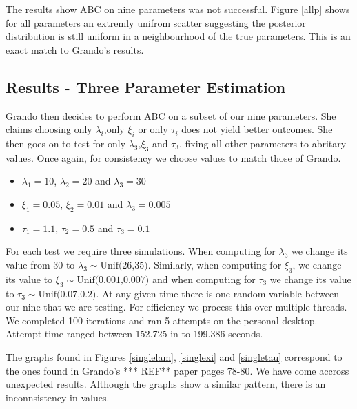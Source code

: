The results show ABC on nine parameters was not successful. Figure \ref{allp} shows for all parameters an extremly unifrom scatter suggesting the posterior distribution is still uniform in a neighbourhood of the true parameters. This is an exact match to Grando's results. 

\subsection{Results - Three Parameter Estimation}
\label{subsec3param}

Grando then decides to perform ABC on a subset of our nine parameters. She claims choosing only  $\lambda_i$,only $\xi_i$ or only $\tau_i$ does not yield better outcomes. She then goes on to test for only $\lambda_3$,$\xi_3$ and $\tau_3$, fixing all other parameters to abritary values. Once again, for consistency we choose values to match those of Grando.

\begin{itemize}
    \item $\lambda_1 = 10$, $\lambda_2 = 20$ and $\lambda_3 =30$
    \item $\xi_1 = 0.05$, $\xi_2 = 0.01 $ and $\lambda_3 =0.005$
    \item $\tau_1 =1.1$, $\tau_2 = 0.5$ and $\tau_3 =0.1$
\end{itemize}

For each test we require three simulations. When computing for $\lambda_3$ we change its value from 30 to $\lambda_3 \sim \text{Unif(26,35)}$. Similarly, when computing for $\xi_3$, we change its value to $\xi_3 \sim \text{Unif(0.001,0.007)}$ and when computing for $\tau_3$ we change its value to $\tau_3 \sim \text{Unif(0.07,0.2)}$. At any given time there is one random variable between our nine that we are testing. For efficiency we process this over multiple threads. We completed 100 iterations and ran 5 attempts on the personal desktop. Attempt time ranged between 152.725 in to 199.386 seconds.

The graphs found in Figures \ref{singlelam}, \ref{singlexi} and \ref{singletau} correspond to the ones found in Grando’s *** REF** paper pages 78-80. We have come accross unexpected results. Although the graphs show a similar pattern, there is an inconnsistency in values. 



